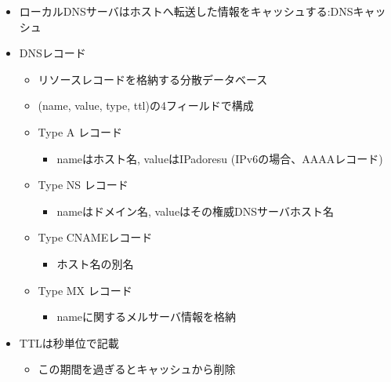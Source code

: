 \begin{itemize}
  \item ローカルDNSサーバはホストへ転送した情報をキャッシュする:DNSキャッシュ
  \item DNSレコード
  \begin{itemize}
    \item リソースレコードを格納する分散データベース
    \item (name, value, type, ttl)の4フィールドで構成
    \item Type A レコード
    \begin{itemize}
      \item nameはホスト名, valueはIPadoresu (IPv6の場合、AAAAレコード)
    \end{itemize}
    \item Type NS レコード
    \begin{itemize}
      \item nameはドメイン名, valueはその権威DNSサーバホスト名
    \end{itemize}
    \item Type CNAMEレコード
    \begin{itemize}
      \item ホスト名の別名
    \end{itemize}
    \item Type MX レコード
    \begin{itemize}
      \item nameに関するメルサーバ情報を格納
    \end{itemize}
  \end{itemize}
  \item TTLは秒単位で記載
  \begin{itemize}
    \item この期間を過ぎるとキャッシュから削除
  \end{itemize}
\end{itemize}

